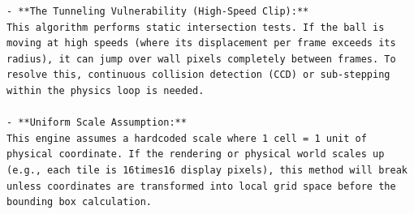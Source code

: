 \begin{lstlisting}[language={}, breaklines=true]
- **The Tunneling Vulnerability (High-Speed Clip):**
This algorithm performs static intersection tests. If the ball is moving at high speeds (where its displacement per frame exceeds its radius), it can jump over wall pixels completely between frames. To resolve this, continuous collision detection (CCD) or sub-stepping within the physics loop is needed.

- **Uniform Scale Assumption:**
This engine assumes a hardcoded scale where 1 cell = 1 unit of physical coordinate. If the rendering or physical world scales up (e.g., each tile is 16times16 display pixels), this method will break unless coordinates are transformed into local grid space before the bounding box calculation.
\end{lstlisting}